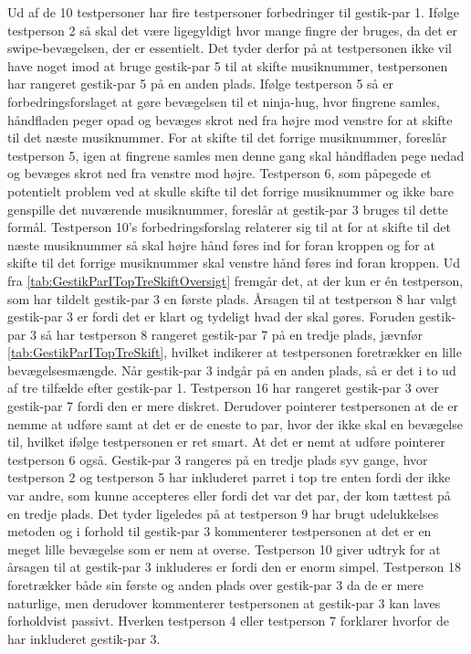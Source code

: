 Ud af de 10 testpersoner har fire testpersoner forbedringer til gestik-par 1. Ifølge testperson 2 så skal det være ligegyldigt hvor mange fingre der bruges, da det er swipe-bevægelsen, der er essentielt. Det tyder derfor på at testpersonen ikke vil have noget imod at bruge gestik-par 5 til at skifte musiknummer, testpersonen har rangeret gestik-par 5 på en anden plads. Ifølge testperson 5 så er forbedringsforslaget at gøre bevægelsen til et ninja-hug, hvor fingrene samles, håndfladen peger opad og bevæges skrot ned fra højre mod venstre for at skifte til det næste musiknummer. For at skifte til det forrige musiknummer, foreslår testperson 5, igen at fingrene samles men denne gang skal håndfladen pege nedad og bevæges skrot ned fra venstre mod højre. Testperson 6, som påpegede et potentielt problem ved at skulle skifte til det forrige musiknummer og ikke bare genspille det nuværende musiknummer, foreslår at gestik-par 3 bruges til dette formål. Testperson 10's forbedringsforslag relaterer sig til at for at skifte til det næste musiknummer så skal højre hånd føres ind for foran kroppen og for at skifte til det forrige musiknummer skal venstre hånd føres ind foran kroppen. \blankline
%
Ud fra \autoref{tab:GestikParITopTreSkiftOversigt} fremgår det, at der kun er én testperson, som har tildelt gestik-par 3 en første plads. Årsagen til at testperson 8 har valgt gestik-par 3 er fordi det er klart og tydeligt hvad der skal gøres. Foruden gestik-par 3 så har testperson 8 rangeret gestik-par 7 på en tredje plads, jævnfør \autoref{tab:GestikParITopTreSkift}, hvilket indikerer at testpersonen foretrækker en lille bevægelsesmængde. Når gestik-par 3 indgår på en anden plads, så er det i to ud af tre tilfælde efter gestik-par 1. Testperson 16 har rangeret gestik-par 3 over gestik-par 7 fordi den er mere diskret. Derudover pointerer testpersonen at de er nemme at udføre samt at det er de eneste to par, hvor der ikke skal en bevægelse til, hvilket ifølge testpersonen er ret smart. At det er nemt at udføre pointerer testperson 6 også. Gestik-par 3 rangeres på en tredje plads syv gange, hvor testperson 2 og testperson 5 har inkluderet parret i top tre enten fordi der ikke var andre, som kunne accepteres eller fordi det var det par, der kom tættest på en tredje plads. Det tyder ligeledes på at testperson 9 har brugt udelukkelses metoden og i forhold til gestik-par 3 kommenterer testpersonen at det er en meget lille bevægelse som er nem at overse. Testperson 10 giver udtryk for at årsagen til at gestik-par 3 inkluderes er fordi den er enorm simpel. Testperson 18 foretrækker både sin første og anden plads over gestik-par 3 da de er mere naturlige, men derudover kommenterer testpersonen at gestik-par 3 kan laves forholdvist passivt. Hverken testperson 4 eller testperson 7 forklarer hvorfor de har inkluderet gestik-par 3. 

